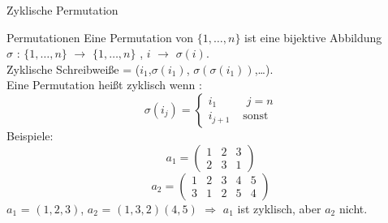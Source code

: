 \documentclass{beamer}
\begin{document}
\begin{frame}{Zyklische Permutation}
\begin{block}{Permutationen}
Eine Permutation von $\{1,\dots,n\}$ ist eine bijektive Abbildung\\ $\sigma$ : $\{1,\dots,n\}$ $\rightarrow$ $\{1,\dots,n\}$ , $i$ $\rightarrow$ $\sigma(i)$. \\[4pt]
Zyklische Schreibweiße = ($i_1$,$\sigma(i_1)$, $\sigma(\sigma(i_{1}))$,\dots).\\[4pt]
Eine Permutation heißt zyklisch wenn : \[ \sigma(i_j) = \left\{\begin{array}{cl}i_1 & \mbox{  $j=n$} \\i_{j+1} & \mbox{  sonst}\end{array} \right. \]
Beispiele:
\[
  a_1 = 
  \begin{pmatrix}
    1 & 2 & 3 \\
    2 & 3 & 1 
  \end{pmatrix}
\] \[
  a_2 = 
  \begin{pmatrix}
    1 & 2 & 3 & 4 & 5\\
    3 & 1 & 2 & 5 & 4
  \end{pmatrix}
\] $a_1$ = $(1,2,3)$, $a_2$ = $(1,3,2)(4,5)$ $\Rightarrow$ $a_1$ ist zyklisch, aber $a_2$ nicht.

\end{block}
\end{frame}
\end{document}
